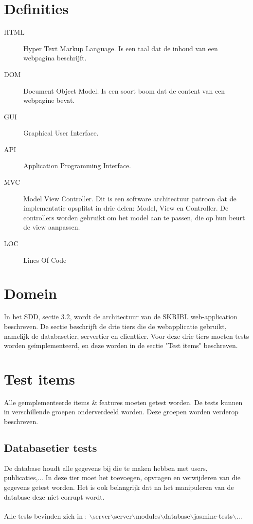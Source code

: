\documentclass{article}
\begin{document}
\section{Definities}
\begin{description}
\item[HTML]Hyper Text Markup Language. Is een taal dat de inhoud van een webpagina beschrijft.
\item[DOM]Document Object Model. Is een soort boom dat de content van een webpagine bevat.
\item[GUI]Graphical User Interface.
\item[API]Application Programming Interface.
\item[MVC]Model View Controller. Dit is een software architectuur patroon dat de implementatie opsplitst in drie delen: Model, View en Controller. De controllers worden gebruikt om het model aan te passen, die op hun beurt de view aanpassen. 
\item[LOC] Lines Of Code
\end{description}

\section{Domein}
In het SDD, sectie 3.2, wordt de architectuur van de SKRIBL web-application beschreven. De sectie beschrijft de drie tiers die de webapplicatie gebruikt, namelijk de databasetier, servertier en clienttier. Voor deze drie tiers moeten tests worden ge\"implementeerd, en deze worden in de sectie "Test items" beschreven.

\section{Test items}
Alle ge\"implementeerde items \& features moeten getest worden. De tests kunnen in verschillende groepen onderverdeeld worden. Deze groepen worden verderop beschreven.

\subsection{Databasetier tests}
De database houdt alle gegevens bij die te maken hebben met users, publicaties,... In deze tier moet het toevoegen, opvragen en verwijderen van die gegevens getest worden. Het is ook belangrijk dat na het manipuleren van de database deze niet corrupt wordt.
\\
\\
Alle tests bevinden zich in : $\backslash$server$\backslash$server$\backslash$modules$\backslash$database$\backslash$jasmine-tests$\backslash$...
\end{document}
